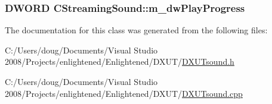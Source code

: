 \label{class_c_streaming_sound_a073ea54d4aa5ade06dd00f75cb0e07cd}
\hypertarget{class_c_streaming_sound_a35cb3a07748cac48d75cef69ceafa476}{
\subsubsection[{m\_\-dwPlayProgress}]{\setlength{\rightskip}{0pt plus 5cm}DWORD {\bf CStreamingSound::m\_\-dwPlayProgress}}}
\label{class_c_streaming_sound_a35cb3a07748cac48d75cef69ceafa476}


The documentation for this class was generated from the following files:\begin{DoxyCompactItemize}
\item 
C:/Users/doug/Documents/Visual Studio 2008/Projects/enlightened/Enlightened/DXUT/\hyperlink{_d_x_u_tsound_8h}{DXUTsound.h}\item 
C:/Users/doug/Documents/Visual Studio 2008/Projects/enlightened/Enlightened/DXUT/\hyperlink{_d_x_u_tsound_8cpp}{DXUTsound.cpp}\end{DoxyCompactItemize}
